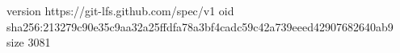version https://git-lfs.github.com/spec/v1
oid sha256:213279c90e35c9aa32a25ffdfa78a3bf4cadc59c42a739eeed42907682640ab9
size 3081
